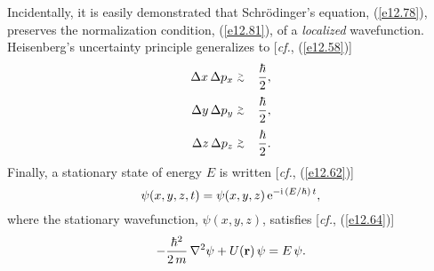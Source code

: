 Incidentally, it is easily demonstrated that Schr\"{o}dinger's equation, (\ref{e12.78}), preserves the normalization
condition, (\ref{e12.81}), of a {\em localized}\/ wavefunction. 
Heisenberg's uncertainty principle generalizes to [{\em cf.}, (\ref{e12.58})]
\begin{eqnarray}
\Delta x\,\Delta p_x&\stackrel {_{\normalsize>}}{_{\normalsize \sim}} &\frac{\hbar}{2},\\[0.5ex]
\Delta y\,\Delta p_y&\stackrel {_{\normalsize>}}{_{\normalsize \sim}} &\frac{\hbar}{2},\\[0.5ex]
\Delta z\,\Delta p_z&\stackrel {_{\normalsize>}}{_{\normalsize \sim}} &\frac{\hbar}{2}.
\end{eqnarray}
Finally, a stationary state of energy $E$ is written [{\em cf.}, (\ref{e12.62})]
\begin{equation}
\psi(x,y,z,t) = \psi(x,y,z)\,{\rm e}^{-{\rm i}\,(E/\hbar)\,t},
\end{equation}
where the stationary wavefunction, $\psi(x,y,z)$, satisfies [{\em cf.}, (\ref{e12.64})]
\begin{equation}
 - \frac{\hbar^2}{2\,m}\,\nabla^2\psi + U({\bf r})\,\psi = E\,\psi.
\end{equation}

